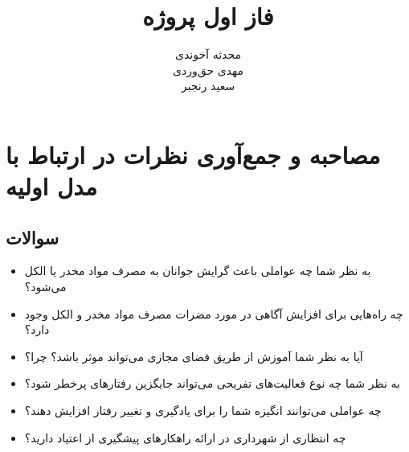 \documentclass[dvipsnames, svgnames, x11names, 11pt]{article}
\title{فاز اول پروژه}
\author{
محدثه آخوندی \\
مهدی حق‌وردی \\
سعید رنجبر
}
\date{}
\begin{document}
\maketitle
\tableofcontents

\section{مصاحبه و جمع‌آوری نظرات در ارتباط با مدل اولیه}

\subsection{سوالات}
\begin{itemize}
\item 
به نظر شما چه عواملی باعث گرایش جوانان به مصرف مواد مخدر یا الکل می‌شود؟
\item 
چه راه‌هایی برای افزایش آگاهی در مورد مضرات مصرف مواد مخدر و الکل وجود دارد؟
\item 
آیا به نظر شما آموزش از طریق فضای مجازی می‌تواند موثر باشد؟ چرا؟
\item 
به نظر شما چه نوع فعالیت‌های تفریحی می‌تواند جایگزین رفتارهای پرخطر شود؟
\item 
چه عواملی می‌توانند انگیزه شما را برای یادگیری و تغییر رفتار افزایش دهند؟
\item 
چه انتظاری از شهرداری در ارائه راهکارهای پیشگیری از اعتیاد دارید؟
\end{itemize}
\end{document}
